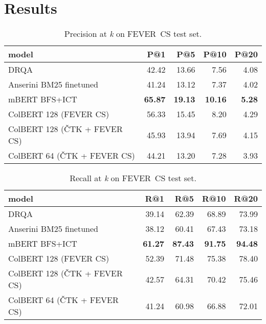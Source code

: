 \section{Results}
\label{section:results}
\begin{table}[H] \label{table:fever-p}
    \centering
    \begin{tabular}{lrrrr}
    \toprule
                            model &    P@1 &    P@5 &   P@10 &  P@20 \\
    \midrule
                             DRQA &  42.42 &  13.66 &   7.56 &  4.08 \\
          Anserini BM25 finetuned &  41.24 &  13.12 &   7.37 &  4.02 \\
                    mBERT BFS+ICT &  \textbf{65.87} &  \textbf{19.13} &  \textbf{10.16} &  \textbf{5.28} \\
           ColBERT 128 (FEVER CS) &  56.33 &  15.45 &   8.20 &  4.29 \\
     ColBERT 128 (ČTK + FEVER CS) &  45.93 &  13.94 &   7.69 &  4.15 \\
      ColBERT 64 (ČTK + FEVER CS) &  44.21 &  13.20 &   7.28 &  3.93 \\
    \bottomrule
    \end{tabular}
    \caption{Precision at \emph{k} on FEVER~CS test set.}
\end{table}

\begin{table}[H] \label{table:fever-r}
    \centering
    \begin{tabular}{lrrrr}
    \toprule
                            model &    R@1 &    R@5 &   R@10 &   R@20 \\
    \midrule
                             DRQA &  39.14 &  62.39 &  68.89 &  73.99 \\
          Anserini BM25 finetuned &  38.12 &  60.41 &  67.43 &  73.18 \\
                    mBERT BFS+ICT &  \textbf{61.27} &  \textbf{87.43} &  \textbf{91.75} &  \textbf{94.48} \\
           ColBERT 128 (FEVER CS) &  52.39 &  71.48 &  75.38 &  78.40 \\
     ColBERT 128 (ČTK + FEVER CS) &  42.57 &  64.31 &  70.42 &  75.46 \\
      ColBERT 64 (ČTK + FEVER CS) &  41.24 &  60.98 &  66.88 &  72.01 \\
    \bottomrule
    \end{tabular}
    \caption{Recall at \emph{k} on FEVER~CS test set.}
\end{table}


